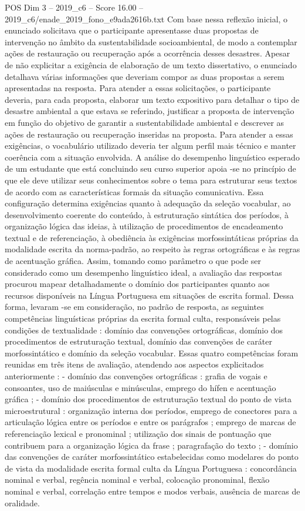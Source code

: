 \begin{textsample}{POS Dim 3 – 2019\_c6 – Score 16.00 – 2019\_c6/enade\_2019\_fono\_e9ada2616b.txt}
Com base nessa reflexão inicial, o enunciado solicitava que o participante apresentasse duas propostas de intervenção no âmbito da sustentabilidade socioambiental, de modo a contemplar ações de restauração ou recuperação após a ocorrência desses desastres.
Apesar de não explicitar a exigência de elaboração de um texto dissertativo, o enunciado detalhava várias informações que deveriam compor as duas propostas a serem apresentadas na resposta.
Para atender a essas solicitações, o participante deveria, para cada proposta, elaborar um texto expositivo para detalhar o tipo de desastre ambiental a que estava se referindo, justificar a proposta de intervenção em função do objetivo de garantir a sustentabilidade ambiental e descrever as ações de restauração ou recuperação inseridas na proposta.
Para atender a essas exigências, o vocabulário utilizado deveria ter algum perfil mais técnico e manter coerência com a situação envolvida.
A análise do desempenho linguístico esperado de um estudante que está concluindo seu curso superior apoia -se no princípio de que ele deve utilizar seus conhecimentos sobre o tema para estruturar seus textos de acordo com as características formais da situação comunicativa.
Essa configuração determina exigências quanto à adequação da seleção vocabular, ao desenvolvimento coerente do conteúdo, à estruturação sintática dos períodos, à organização lógica das ideias, à utilização de procedimentos de encadeamento textual e de referenciação, à obediência às exigências morfossintáticas próprias da modalidade escrita da norma-padrão, ao respeito às regras ortográficas e às regras de acentuação gráfica.
Assim, tomando como parâmetro o que pode ser considerado como um desempenho linguístico ideal, a avaliação das respostas procurou mapear detalhadamente o domínio dos participantes quanto aos recursos disponíveis na Língua Portuguesa em situações de escrita formal.
Dessa forma, levaram -se em consideração, no padrão de resposta, as seguintes competências linguísticas próprias da escrita formal culta, responsáveis pelas condições de textualidade : domínio das convenções ortográficas, domínio dos procedimentos de estruturação textual, domínio das convenções de caráter morfossintático e domínio da seleção vocabular.
Essas quatro competências foram reunidas em três itens de avaliação, atendendo aos aspectos explicitados anteriormente : - domínio das convenções ortográficas : grafia de vogais e consoantes, uso de maiúsculas e minúsculas, emprego do hífen e acentuação gráfica ; - domínio dos procedimentos de estruturação textual do ponto de vista microestrutural : organização interna dos períodos, emprego de conectores para a articulação lógica entre os períodos e entre os parágrafos ; emprego de marcas de referenciação lexical e pronominal ; utilização dos sinais de pontuação que contribuem para a organização lógica da frase ; paragrafação do texto ; - domínio das convenções de caráter morfossintático estabelecidas como modelares do ponto de vista da modalidade escrita formal culta da Língua Portuguesa : concordância nominal e verbal, regência nominal e verbal, colocação pronominal, flexão nominal e verbal, correlação entre tempos e modos verbais, ausência de marcas de oralidade.

\end{textsample}
